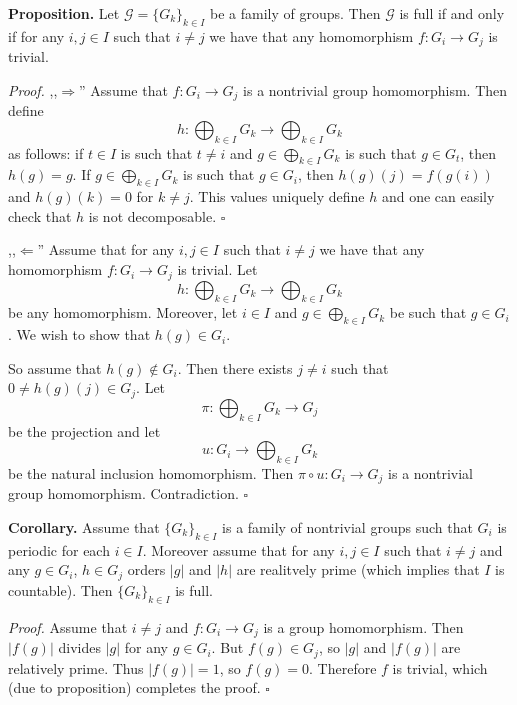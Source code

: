 \documentclass[12pt]{article}
\begin{document}
\textbf{Proposition.} Let $\mathcal{G}=\{G_k\}_{k\in I}$ be a family of groups. Then $\mathcal{G}$ is full if and only if for any $i,j\in I$ such that $i\neq j$ we have that any homomorphism $f:G_i\to G_j$ is trivial.

\textit{Proof.} ,,$\Rightarrow$'' Assume that $f:G_i\to G_j$ is a nontrivial group homomorphism. Then define $$h:\bigoplus_{k\in I} G_k\to \bigoplus_{k\in I} G_k$$ as follows: if $t\in I$ is such that $t\neq i$ and $g\in\bigoplus_{k\in I}G_k$ is such that $g\in G_t$, then $h(g)=g$. If $g\in\bigoplus_{k\in I}G_k$ is such that $g\in G_i$, then $h(g)(j)=f(g(i))$ and $h(g)(k)=0$ for $k\neq j$. This values uniquely define $h$ and one can easily check that $h$ is not decomposable. $\square$

,,$\Leftarrow$'' Assume that for any $i,j\in I$ such that $i\neq j$ we have that any homomorphism $f:G_i\to G_j$ is trivial. Let $$h:\bigoplus_{k\in I} G_k\to \bigoplus_{k\in I} G_k$$ be any homomorphism. Moreover, let $i\in I$ and $g\in\bigoplus_{k\in I} G_k$ be such that $g\in G_i$. We wish to show that $h(g)\in G_i$.

So assume that $h(g)\not\in G_i$. Then there exists $j\neq i$ such that $0\neq h(g)(j)\in G_j$. Let $$\pi:\bigoplus_{k\in I} G_k\to G_j$$ be the projection and let $$u:G_i\to \bigoplus_{k\in I} G_k$$ be the natural inclusion homomorphism. Then $\pi\circ u:G_i\to G_j$ is a nontrivial group homomorphism. Contradiction. $\square$


\textbf{Corollary.} Assume that $\{G_k\}_{k\in I}$ is a family of nontrivial groups such that $G_i$ is periodic for each $i\in I$. Moreover assume that for any $i,j\in I$ such that $i\neq j$ and any $g\in G_i$, $h\in G_j$ orders $|g|$ and $|h|$ are realitvely prime (which implies that $I$ is countable). Then $\{G_k\}_{k\in I}$ is full.

\textit{Proof.} Assume that $i\neq j$ and $f:G_i\to G_j$ is a group homomorphism. Then $|f(g)|$ divides $|g|$ for any $g\in G_i$. But $f(g)\in G_j$, so $|g|$ and $|f(g)|$ are relatively prime. Thus $|f(g)|=1$, so $f(g)=0$. Therefore $f$ is trivial, which (due to proposition) completes the proof. $\square$
\end{document}
